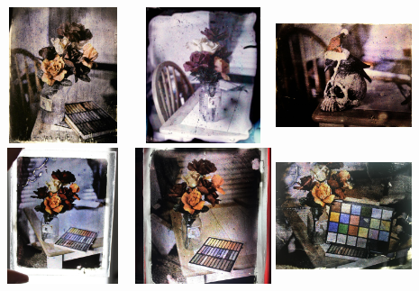 \documentclass[11pt]{article}
\begin{document}
\begin{center}
\includegraphics[width=4cm, height=4cm]{img/part1_24.jpg}
\includegraphics[width=4cm, height=4cm]{img/part1_25.jpg}
\includegraphics[width=4cm, height=4cm]{img/part1_26.jpg}
\includegraphics[width=4cm, height=4cm]{img/part1_27.jpg}
\includegraphics[width=4cm, height=4cm]{img/part1_28.jpg}
\includegraphics[width=4cm, height=4cm]{img/part1_29.jpg}

\end{center}
\end{document}
